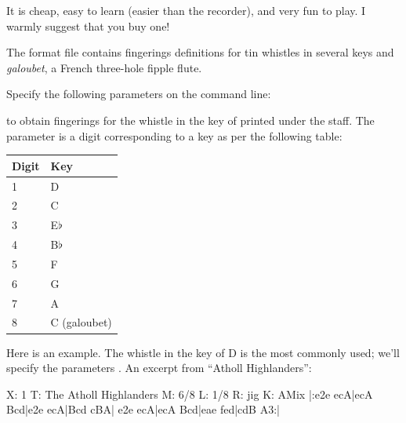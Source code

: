 \documentclass[a4paper,fullpage,12pt]{book}
\begin{document}
\begin{bytheway}

  It is cheap, easy to learn (easier than the recorder), and very fun
  to play. I warmly suggest that you buy one!

\end{bytheway}

The format file  contains fingerings definitions for
tin whistles in several keys and \emph{galoubet}, a French three-hole
fipple flute.

Specify the following parameters on the \abcm{} command line:

\medskip

   

\medskip

to obtain fingerings for the whistle in the key of  printed
under the staff. The parameter  is a digit corresponding to
a key as per the following table:

\medskip

\begin{center}
  \begin{tabular}{ll}
    \toprule %
    Digit & Key\\
    \midrule %
    1 & D\\
    2 & C\\
    3 & E$\flat$\\
    4 & B$\flat$\\
    5 & F\\
    6 & G\\
    7 & A\\
    8 & C (galoubet)\\
    \bottomrule %
  \end{tabular}
\end{center}

\medskip

Here is an example. The whistle in the key of D is the most commonly
used; we'll specify the parameters . An excerpt
from ``Atholl Highlanders'':

\begin{abcsource}
X: 1
T: The Atholl Highlanders
M: 6/8
L: 1/8
R: jig
K: AMix
%
|:e2e ecA|ecA Bcd|e2e ecA|Bcd cBA|
e2e ecA|ecA Bcd|eae fed|cdB A3:|
\end{abcsource}



\noteseparator
\end{document}
